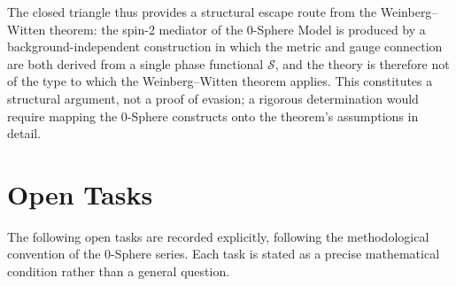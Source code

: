 \documentclass[%
 reprint, amsmath,amssymb, aps, prd, ]{revtex4-2}
\numberwithin{equation}{section}
\newcommand{\SyngeS}{\mathcal{S}}
\begin{document}
The closed triangle thus provides a structural escape route from the Weinberg--Witten theorem: the spin-2 mediator of the 0-Sphere Model is produced by a background-independent construction in which the metric and gauge connection are both derived from a single phase functional $\SyngeS$, and the theory is therefore not of the type to which the Weinberg--Witten theorem applies.
This constitutes a structural argument, not a proof of evasion; a rigorous determination would require mapping the 0-Sphere constructs onto the theorem's assumptions in detail.

\section{Open Tasks}
\label{sec:open}

The following open tasks are recorded explicitly, following the methodological convention of the 0-Sphere series.
Each task is stated as a precise mathematical condition rather than a general question.
\end{document}
